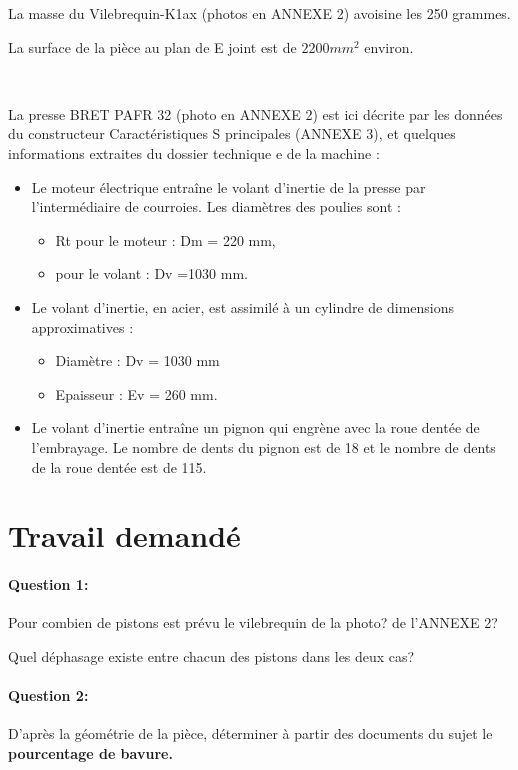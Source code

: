 La masse du \og Vilebrequin-K1ax \fg (photos en ANNEXE 2) avoisine les 250 grammes.

La surface de la pièce au plan de E joint est de $2200 mm^2$ environ.

~\

La presse \og BRET PAFR 32 \fg (photo en ANNEXE 2) est ici décrite par les données du constructeur \og Caractéristiques S principales \fg (ANNEXE 3), et quelques informations extraites du dossier technique e de la machine :
\begin{itemize}
 \item Le moteur électrique entraîne le volant d'inertie de la presse par l'intermédiaire de courroies. Les diamètres des poulies sont :
 \begin{itemize}
  \item Rt pour le moteur : Dm = 220 mm,
  \item pour le volant : Dv =1030 mm.
 \end{itemize}
 \item Le volant d'inertie, en acier, est assimilé à un cylindre de dimensions approximatives :
 \begin{itemize}
  \item Diamètre : Dv = 1030 mm
  \item Epaisseur : Ev = 260 mm.
 \end{itemize}
 \item Le volant d'inertie entraîne un pignon qui engrène avec la roue dentée de l'embrayage. Le nombre de dents du pignon est de 18 et le nombre de dents de la roue dentée est de 115.
\end{itemize}

\section{Travail demandé}

\paragraph{Question 1:} Pour combien de pistons est prévu le vilebrequin de la photo? de l'ANNEXE 2?

Quel déphasage existe entre chacun des pistons dans les deux cas?

\paragraph{Question 2:} D'après la géométrie de la pièce, déterminer à partir des documents du sujet le \textbf{pourcentage de bavure.}

